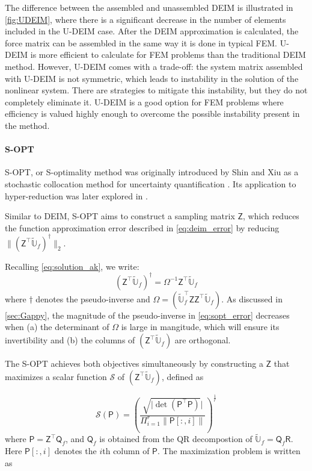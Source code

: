 \documentclass[11pt]{article}
\newcommand{\mat}[1]{\mathsf{#1}}
\begin{document}
The difference between the assembled and unassembled DEIM is illustrated in \cref{fig:UDEIM}, where there is a significant decrease in the number of elements included in the U-DEIM case.
After the DEIM approximation is calculated, the force matrix can be assembled in the same way it is done in typical FEM.
U-DEIM is more efficient to calculate for FEM problems than the traditional DEIM method.
However, U-DEIM comes with a trade-off: the system matrix assembled with U-DEIM is not symmetric, which leads to instability in the solution of the nonlinear system.
There are strategies to mitigate this instability, but they do not completely eliminate it.
U-DEIM is a good option for FEM problems where efficiency is valued highly enough to overcome the possible instability present in the method.
\paragraph{S-OPT} S-OPT, or S-optimality method was originally introduced by Shin and Xiu as a stochastic collocation method for uncertainty quantification \cite{shin2016SOPT}.
Its application to hyper-reduction was later explored in \cite{lauzon2024s-opt}.


Similar to DEIM, S-OPT aims to construct a sampling matrix $\mat{Z}$, which reduces the function approximation error described in \cref{eq:deim_error} by reducing $\|\left(\mat{Z}^\top \widetilde{\mathbb{U}}_f\right)^{\dagger}\|_2$.


Recalling \cref{eq:solution_ak}, we write:
\begin{equation}
\left(\mat{Z}^{\top}\widetilde{\mathbb{U}}_f\right)^{\dagger} = \Omega^{-1}\mat{Z}^{\top}\widetilde{\mathbb{U}}_f
\label{eq:sopt_error}
\end{equation}
where $\dagger$ denotes the pseudo-inverse and $\Omega = \left(\widetilde{\mathbb{U}}_f^{\top}\mat{Z}\mat{Z}^{\top}\widetilde{\mathbb{U}}_f\right)$.
As discussed in \cref{sec:Gappy}, the magnitude of the pseudo-inverse in \cref{eq:sopt_error} decreases when (a) the determinant of $\Omega$ is large in mangitude, which will ensure its invertibility and (b) the columns of $\left(\mat{Z}^\top \widetilde{\mathbb{U}}_f\right)$ are orthogonal.


The S-OPT achieves both objectives simultaneously by constructing a $\mat{Z}$ that maximizes a scalar function $\mathscr{S}$ of $\left(\mat{Z}^\top \widetilde{\mathbb{U}}_f\right)$, defined as

\begin{equation}
    \mathscr{S}(\mat{P}) = \left( \frac{\sqrt{|\det \left( \mat{P}^\top \mat{P}\right)}|} {\Pi_{i=1}^r \|\mat{P}[:,i]\|}\right)^{\frac{1}{r}}
\end{equation}
where $\mat{P}=\mat{Z}^\top {\mat{Q}}_f$, and $\mat{Q}_f$ is obtained from the QR decompostion of $\widetilde{\mathbb{U}}_f=\mat{Q}_f\mat{R}$.
Here $\mat{P}[:,i]$ denotes the $i$th column of $\mat{P}$.
The maximization problem is written as
\end{document}
